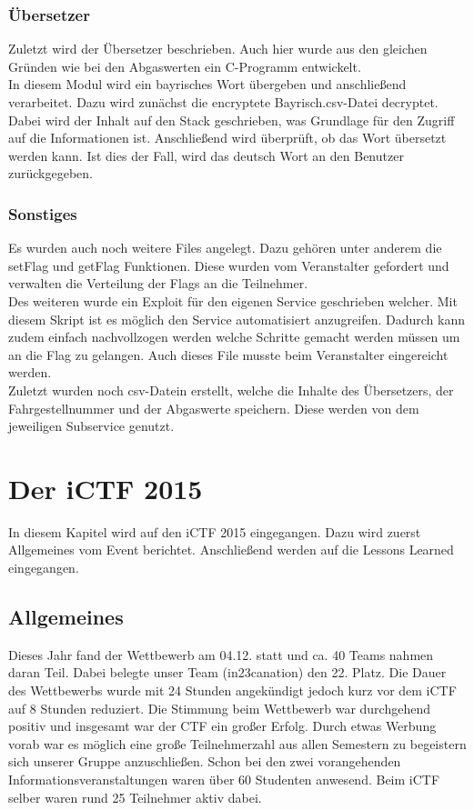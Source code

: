 \subsubsection{Übersetzer}
Zuletzt wird der Übersetzer beschrieben. Auch hier wurde aus den gleichen Gründen wie bei den Abgaswerten ein C-Programm entwickelt.
\\

In diesem Modul wird ein bayrisches Wort übergeben und anschließend verarbeitet. Dazu wird zunächst die encryptete Bayrisch.csv-Datei decryptet. Dabei wird der Inhalt auf den Stack geschrieben, was Grundlage für den Zugriff auf die Informationen ist. Anschließend wird überprüft, ob das Wort übersetzt werden kann. Ist dies der Fall, wird das deutsch Wort an den Benutzer zurückgegeben.

\subsubsection{Sonstiges}
Es wurden auch noch weitere Files angelegt. 
Dazu gehören unter anderem die setFlag und getFlag Funktionen. Diese wurden vom Veranstalter gefordert und verwalten die Verteilung der Flags an die Teilnehmer.
\\

Des weiteren wurde ein Exploit für den eigenen Service geschrieben welcher. Mit diesem Skript ist es möglich den Service automatisiert anzugreifen. Dadurch kann zudem einfach nachvollzogen werden welche Schritte gemacht werden müssen um an die Flag zu gelangen. Auch dieses File musste beim Veranstalter eingereicht werden.
\\

Zuletzt wurden noch csv-Datein erstellt, welche die Inhalte des Übersetzers, der Fahrgestellnummer und der Abgaswerte speichern. Diese werden von dem jeweiligen Subservice genutzt.


\section{Der iCTF 2015}
In diesem Kapitel wird auf den iCTF 2015 eingegangen. Dazu wird zuerst Allgemeines vom Event berichtet. Anschließend werden auf die Lessons Learned eingegangen.

\subsection{Allgemeines}
Dieses Jahr fand der Wettbewerb am 04.12. statt und ca. 40 Teams nahmen daran Teil. Dabei belegte unser Team (in23canation) den 22. Platz. Die Dauer des Wettbewerbs wurde mit 24 Stunden angekündigt jedoch kurz vor dem iCTF auf 8 Stunden reduziert. 
Die Stimmung beim Wettbewerb war durchgehend positiv und insgesamt war der CTF ein großer Erfolg. Durch etwas Werbung vorab war es möglich eine große Teilnehmerzahl aus allen Semestern zu begeistern sich unserer Gruppe anzuschließen. Schon bei den zwei vorangehenden Informationsveranstaltungen waren über 60 Studenten anwesend. Beim iCTF selber waren rund 25 Teilnehmer aktiv dabei. 

